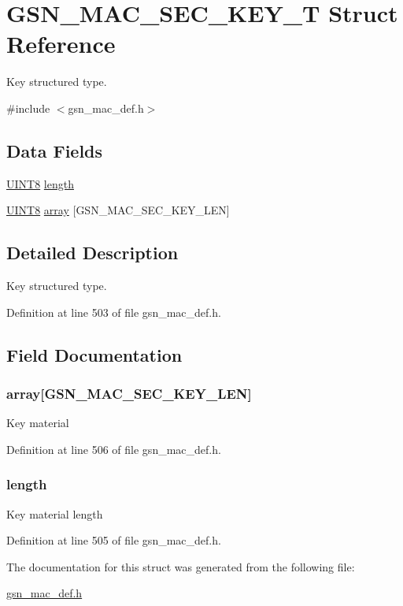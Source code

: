 \hypertarget{a00131}{
\section{GSN\_\-MAC\_\-SEC\_\-KEY\_\-T Struct Reference}
\label{a00131}
}


Key structured type.  




{\ttfamily \#include $<$gsn\_\-mac\_\-def.h$>$}

\subsection*{Data Fields}
\begin{DoxyCompactItemize}
\item 
\hyperlink{a00660_gab27e9918b538ce9d8ca692479b375b6a}{UINT8} \hyperlink{a00131_ae360fb41f422c7c83b87d9af070cbd31}{length}
\item 
\hyperlink{a00660_gab27e9918b538ce9d8ca692479b375b6a}{UINT8} \hyperlink{a00131_ad4ba77cd54794f0e98e8cb124210c5e2}{array} \mbox{[}GSN\_\-MAC\_\-SEC\_\-KEY\_\-LEN\mbox{]}
\end{DoxyCompactItemize}


\subsection{Detailed Description}
Key structured type. 

Definition at line 503 of file gsn\_\-mac\_\-def.h.



\subsection{Field Documentation}
\hypertarget{a00131_ad4ba77cd54794f0e98e8cb124210c5e2}{
\subsubsection[{array}]{ {\bf array}\mbox{[}GSN\_\-MAC\_\-SEC\_\-KEY\_\-LEN\mbox{]}}}
\label{a00131_ad4ba77cd54794f0e98e8cb124210c5e2}
Key material 

Definition at line 506 of file gsn\_\-mac\_\-def.h.

\hypertarget{a00131_ae360fb41f422c7c83b87d9af070cbd31}{
\subsubsection[{length}]{ {\bf length}}}
\label{a00131_ae360fb41f422c7c83b87d9af070cbd31}
Key material length 

Definition at line 505 of file gsn\_\-mac\_\-def.h.



The documentation for this struct was generated from the following file:\begin{DoxyCompactItemize}
\item 
\hyperlink{a00522}{gsn\_\-mac\_\-def.h}\end{DoxyCompactItemize}
